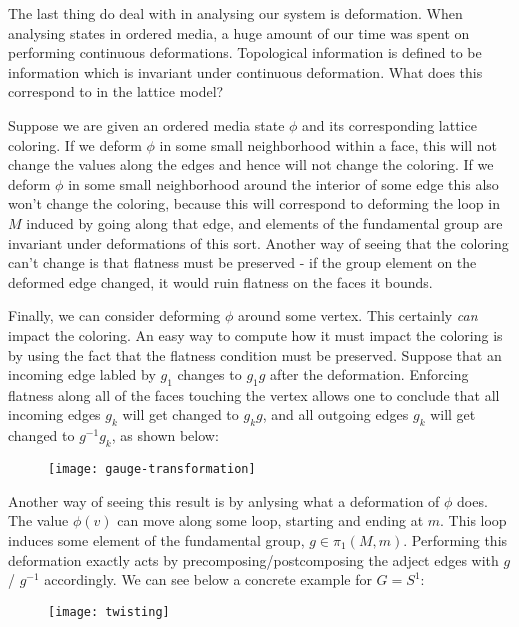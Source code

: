 The last thing do deal with in analysing our system is deformation. When analysing states in ordered media, a huge amount of our time was spent on performing continuous deformations. Topological information is defined to be information which is invariant under continuous deformation. What does this correspond to in the lattice model?

Suppose we are given an ordered media state $\phi$ and its corresponding lattice coloring. If we deform $\phi$ in some small neighborhood within a face, this will not change the values along the edges and hence will not change the coloring. If we deform $\phi$ in some small neighborhood around the interior of some edge this also won't change the coloring, because this will correspond to deforming the loop in $M$ induced by going along that edge, and elements of the fundamental group are invariant under deformations of this sort. Another way of seeing that the coloring can't change is that flatness must be preserved - if the group element on the deformed edge changed, it would ruin flatness on the faces it bounds.

Finally, we can consider deforming $\phi$ around some vertex. This certainly \textit{can} impact the coloring. An easy way to compute how it must impact the coloring is by using the fact that the flatness condition must be preserved. Suppose that an incoming edge labled by $g_1$ changes to $g_1 g$ after the deformation. Enforcing flatness along all of the faces touching the vertex allows one to conclude that all incoming edges $g_k$ will get changed to $g_k g$, and all outgoing edges $g_k$ will get changed to $g^{-1}g_k$, as shown below:

\begin{figure}[h]
\begin{center}
\texttt{[image: gauge-transformation]}
\end{center}
\end{figure}

Another way of seeing this result is by anlysing what a deformation of $\phi$ does. The value $\phi(v)$ can move along some loop, starting and ending at $m$. This loop induces some element of the fundamental group, $g\in \pi_1(M,m)$. Performing this deformation exactly acts by precomposing/postcomposing the adject edges with $g$/ $g^{-1}$ accordingly. We can see below a concrete example for $G=S^{1}$:

\begin{figure}[h]
\begin{center}
\texttt{[image: twisting]}
\end{center}
\end{figure}

